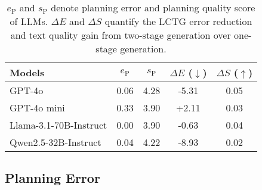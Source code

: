 \begin{table}[t]
  \centering
   \renewcommand\arraystretch{1.3}
  \setlength{\tabcolsep}{0.3em} 
  \small
    \begin{tabular}{lcccc}
    \toprule
      \textbf{Models} & $e_{\text{P}}$  & $s_{\text{P}}$ & $\Delta E$ ($\downarrow$) & $\Delta S$ ($\uparrow$) \\
      \midrule
      GPT-4o                 & 0.06 & 4.28 & -5.31  & 0.05 \\
      GPT-4o mini           & 0.33 & 3.90 & +2.11  & 0.03 \\
      Llama-3.1-70B-Instruct & 0.00 & 3.90 & -0.63 & 0.04 \\
      Qwen2.5-32B-Instruct   & 0.04 & 4.22 & -8.93  & 0.02 \\
      \bottomrule
    \end{tabular}  \caption{\label{tab:planning_error}$e_\text{P}$ and $s_\text{P}$ denote planning error and planning quality score of LLMs. $\Delta E$ and $\Delta S$ quantify the LCTG error reduction and text quality gain from two-stage generation over one-stage generation.}
    \vspace{-10pt}
\end{table}

\vspace{-2pt}

\subsection{Planning Error}
\vspace{-2pt}
\label{sec:planning_error}



